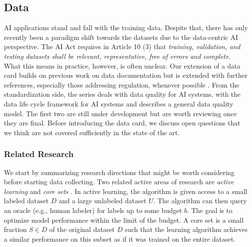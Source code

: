 \newpage

\subsection{Data}
\label{subsec:data}
AI applications stand and fall with the training data. Despite that, there has only recently been a paradigm shift towards the datasets due to the data-centric AI perspective. The AI Act requires in Article 10 (3) that \emph{training, validation, and testing datasets shall be relevant, representative, free of errors and complete}. What this means in practice, however, is often unclear. Our extension of a data card builds on previous work on data documentation but is extended with further references, especially those addressing regulation, whenever possible \citep{Pushkarna2022_DataCards, Gebru2021_DataSheets}. From the standardization side, the \cite{ISO5259} series deals with data quality for AI systems, \cite{ISO8183} with the data life cycle framework for AI systems and \cite{ISO25012} describes a general data quality model. The first two are still under development but are worth reviewing once they are final. Before introducing the data card, we discuss open questions that we think are not covered sufficiently in the state of the art. 


\subsubsection{Related Research} 
We start by summarizing research directions that might be worth considering before starting data collecting.
Two related active areas of research are \emph{active learning} \citep{Settles2010_ActiveLearningSurvey} and \emph{core sets} \citep{Feldman2020_CoreSetsSurvey}. In active learning, the algorithm is given access to a small labeled dataset $D$ and a large unlabeled dataset $U$. The algorithm can then query an oracle (e.g., human labeler) for labels up to some budget $b$. The goal is to optimize model performance within the  limit of the budget. A core set is a small fraction $S\in D$ of the original dataset $D$ such that the learning algorithm achieves a similar performance on this subset as if it was trained on the entire dataset.

